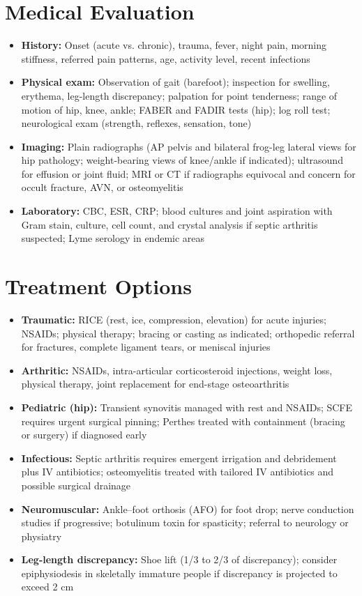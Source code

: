 \section*{Medical Evaluation}
\begin{itemize}
  \item \textbf{History:} Onset (acute vs. chronic), trauma, fever, night pain, morning stiffness, referred pain patterns, age, activity level, recent infections
  \item \textbf{Physical exam:} Observation of gait (barefoot); inspection for swelling, erythema, leg-length discrepancy; palpation for point tenderness; range of motion of hip, knee, ankle; FABER and FADIR tests (hip); log roll test; neurological exam (strength, reflexes, sensation, tone)
  \item \textbf{Imaging:} Plain radiographs (AP pelvis and bilateral frog-leg lateral views for hip pathology; weight-bearing views of knee/ankle if indicated); ultrasound for effusion or joint fluid; MRI or CT if radiographs equivocal and concern for occult fracture, AVN, or osteomyelitis
  \item \textbf{Laboratory:} CBC, ESR, CRP; blood cultures and joint aspiration with Gram stain, culture, cell count, and crystal analysis if septic arthritis suspected; Lyme serology in endemic areas
\end{itemize}

\section*{Treatment Options}
\begin{itemize}
  \item \textbf{Traumatic:} RICE (rest, ice, compression, elevation) for acute injuries; NSAIDs; physical therapy; bracing or casting as indicated; orthopedic referral for fractures, complete ligament tears, or meniscal injuries
  \item \textbf{Arthritic:} NSAIDs, intra-articular corticosteroid injections, weight loss, physical therapy, joint replacement for end-stage osteoarthritis
  \item \textbf{Pediatric (hip):} Transient synovitis managed with rest and NSAIDs; SCFE requires urgent surgical pinning; Perthes treated with containment (bracing or surgery) if diagnosed early
  \item \textbf{Infectious:} Septic arthritis requires emergent irrigation and debridement plus IV antibiotics; osteomyelitis treated with tailored IV antibiotics and possible surgical drainage
  \item \textbf{Neuromuscular:} Ankle--foot orthosis (AFO) for foot drop; nerve conduction studies if progressive; botulinum toxin for spasticity; referral to neurology or physiatry
  \item \textbf{Leg-length discrepancy:} Shoe lift (1/3 to 2/3 of discrepancy); consider epiphysiodesis in skeletally immature people if discrepancy is projected to exceed 2 cm
\end{itemize}


